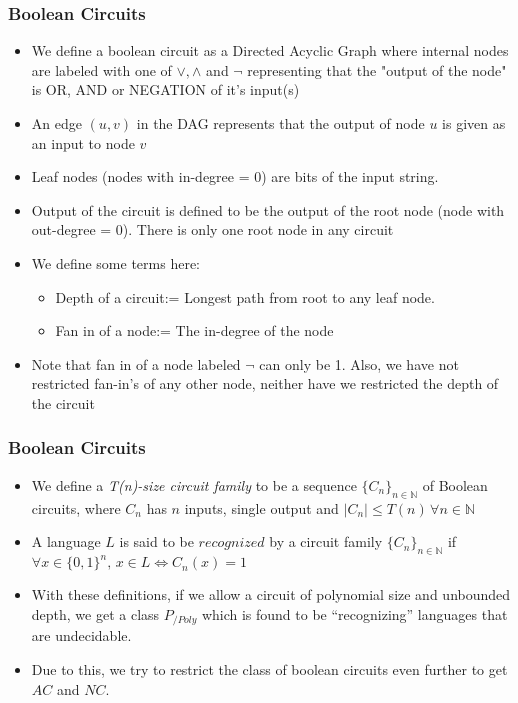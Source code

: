 \documentclass{beamer}[11pt]
\begin{document}
\begin{frame}
\frametitle{Boolean Circuits}
\begin{itemize}
\item We define a boolean circuit as a Directed Acyclic Graph where internal nodes are labeled with one of $\vee,\wedge$ and $ \neg$ representing that the "output of the node" is OR, AND or NEGATION of it's input(s)
\item An edge $(u,v)$ in the DAG represents that the output of node $u$ is given as an input to node $v$
\pause\item Leaf nodes (nodes with in-degree = 0) are bits of the input string.
\item Output of the circuit is defined to be the output of the root node (node with out-degree = 0). There is only one root node in any circuit
\item We define some terms here:
\pause\begin{itemize}
\item Depth of a circuit:= Longest path from root to any leaf node.
\item Fan in of a node:= The in-degree of the node
\end{itemize}
\item Note that fan in of a node labeled $\neg$ can only be 1. Also, we have not restricted fan-in's of any other node, neither have we restricted the depth of the circuit
\end{itemize}
\end{frame}


\begin{frame}
\frametitle{Boolean Circuits}
\begin{itemize}
	\item We define a \emph{T(n)-size circuit family } to be a sequence $\{C_n\}_{n\in \mathbb{N}}$ of Boolean circuits, where $C_n$ has $n$ inputs, single output and $|C_n|\leq T(n) \, \forall n\in \mathbb{N}$ \cite{textbook}
	\item A language $L$ is said to be $recognized$ by a circuit family $\{C_n\}_{n\in \mathbb{N}}$ if $\forall x\in \{0,1\}^n,\, x\in L \iff C_n(x)=1 $ \cite{textbook}
	\pause\item With these definitions, if we allow a circuit of polynomial size and unbounded depth, we get a class $P_{/Poly}$ which is found to be ``recognizing'' languages that are undecidable.
	\item Due to this, we try to restrict the class of boolean circuits even further to get $AC$ and $NC$.
\end{itemize}


\end{frame}
\end{document}
